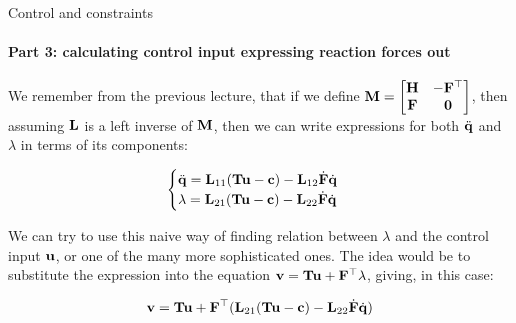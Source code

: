 \documentclass{beamer}
\begin{document}
\begin{frame}{Control and constraints}
\framesubtitle{Part 3: calculating control input expressing reaction forces out}
\begin{flushleft}

We remember from the previous lecture, that if we define $\mathbf{M} = \begin{bmatrix}
    \mathbf{H} & -\mathbf{F}^\top \\
    \mathbf{F} & \mathbf{0}
\end{bmatrix}$, then assuming $\mathbf{L}$ is a left inverse of $\mathbf{M}$, then we can write expressions for both $\ddot{\mathbf{q}}$ and $\lambda$ in terms of its components:

\begin{equation}
\label{eq:normal_form_DAE}
    \begin{cases}
        \ddot{\mathbf{q}} = 
        \mathbf{L}_{11} ( \mathbf{T}\mathbf{u} - \mathbf{c}) - \mathbf{L}_{12} \dot{\mathbf{F}} \dot{\mathbf{q}} \\ 
        \lambda = \mathbf{L}_{21} ( \mathbf{T}\mathbf{u} - \mathbf{c}) - \mathbf{L}_{22} \dot{\mathbf{F}} \dot{\mathbf{q}}
    \end{cases}
\end{equation}

We can try to use this naive way of finding relation between $\lambda$  and the control input $\mathbf{u}$, or one of the many more sophisticated ones. The idea would be to substitute the expression into the equation $\mathbf{v} = \mathbf{T}\mathbf{u} + \mathbf{F}^\top \lambda$, giving, in this case:

\begin{equation}
\mathbf{v} = \mathbf{T}\mathbf{u} + \mathbf{F}^\top (\mathbf{L}_{21} ( \mathbf{T}\mathbf{u} - \mathbf{c}) - \mathbf{L}_{22} \dot{\mathbf{F}} \dot{\mathbf{q}})
\end{equation}

\end{flushleft}
\end{frame}
\end{document}

